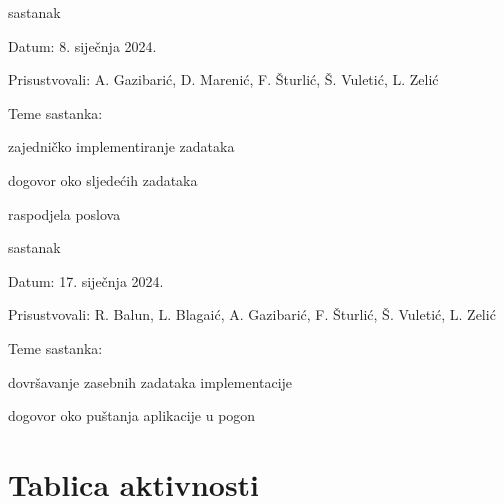 \begin{packed_enum}
			\item  sastanak
			\item[] \begin{packed_item}
				\item Datum: 8. siječnja 2024.
				\item Prisustvovali: A. Gazibarić, D. Marenić, F. Šturlić, Š. Vuletić, L. Zelić
				\item Teme sastanka:
				\begin{packed_item}
					\item  zajedničko implementiranje zadataka
					\item  dogovor oko sljedećih zadataka
					\item  raspodjela poslova
				\end{packed_item}
			\end{packed_item}
			
			\item  sastanak
			\item[] \begin{packed_item}
				\item Datum: 17. siječnja 2024.
				\item Prisustvovali: R. Balun, L. Blagaić, A. Gazibarić, F. Šturlić, Š. Vuletić, L. Zelić
				\item Teme sastanka:
				\begin{packed_item}
					\item  dovršavanje zasebnih zadataka implementacije
					\item  dogovor oko puštanja aplikacije u pogon
				\end{packed_item}
			\end{packed_item}
			
			
		\end{packed_enum}
		
		\eject
		\section*{Tablica aktivnosti}
		

